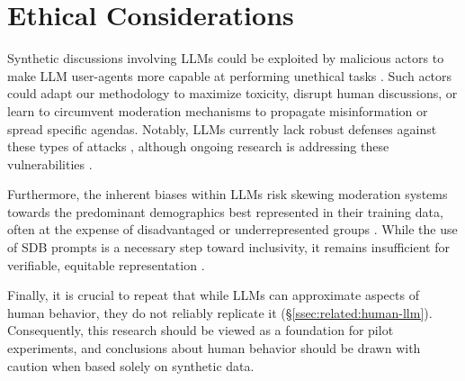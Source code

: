 %
\section{Ethical Considerations}
\label{sec:ethical}

Synthetic discussions involving LLMs could be exploited by malicious actors to make LLM user-agents more capable at performing unethical tasks \cite{majumdar_2024_nefarious, MARULLI20245340}. Such actors could adapt our methodology to  maximize toxicity, disrupt human discussions, or learn to circumvent moderation mechanisms to propagate misinformation or spread specific agendas. Notably, LLMs currently lack robust defenses against these types of attacks \cite{li_2025_vulnerable}, although ongoing research is addressing these vulnerabilities \cite{wang_2025_risk}.

Furthermore, the inherent biases within LLMs risk skewing moderation systems towards the predominant demographics best represented in their training data, often at the expense of disadvantaged or underrepresented groups \cite{rossi_2024, anthis_2025, burton2024large}. While the use of SDB prompts is a necessary step toward inclusivity, it remains insufficient for verifiable, equitable representation \cite{rossi_2024}.


Finally, it is crucial to repeat that while LLMs can approximate aspects of human behavior, they do not reliably replicate it (\S\ref{ssec:related:human-llm}). Consequently, this research should be viewed as a foundation for pilot experiments, and conclusions about human behavior should be drawn with caution when based solely on synthetic data.